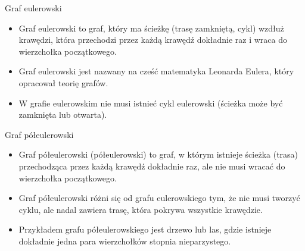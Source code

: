 \documentclass[polish,envcountsect,10pt]{beamer}
\begin{document}
\begin{frame}{Graf eulerowski}
    \begin{itemize}
        \item Graf eulerowski to graf, który ma ścieżkę (trasę zamkniętą, cykl) wzdłuż krawędzi, która przechodzi przez każdą krawędź dokładnie raz i wraca do wierzchołka początkowego.
        \item Graf eulerowski jest nazwany na cześć matematyka Leonarda Eulera, który opracował teorię grafów.
        \item W grafie eulerowskim nie musi istnieć cykl eulerowski (ścieżka może być zamknięta lub otwarta).
    \end{itemize}
    \begin{center}
    \end{center}
\end{frame}

\begin{frame}{Graf półeulerowski}
    \begin{itemize}
        \item Graf półeulerowski (półeulerowski) to graf, w którym istnieje ścieżka (trasa) przechodząca przez każdą krawędź dokładnie raz, ale nie musi wracać do wierzchołka początkowego.
        \item Graf półeulerowski różni się od grafu eulerowskiego tym, że nie musi tworzyć cyklu, ale nadal zawiera trasę, która pokrywa wszystkie krawędzie.
        \item Przykładem grafu półeulerowskiego jest drzewo lub las, gdzie istnieje dokładnie jedna para wierzchołków stopnia nieparzystego.
    \end{itemize}
    \begin{center}
    \end{center}
\end{frame}
\end{document}
